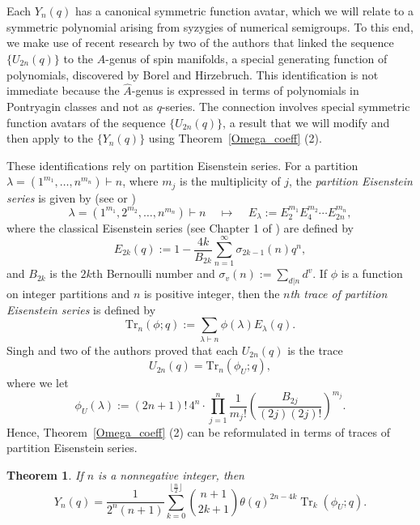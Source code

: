 \documentclass[11pt]{amsart}
\newtheorem{theorem}{Theorem}[section]
\theoremstyle{definition}
\theoremstyle{remark}
\numberwithin{equation}{section}
\DeclareMathOperator{\Tr}{Tr}
\begin{document}
Each $Y_n(q)$ has a canonical symmetric function avatar, which we will relate to a symmetric polynomial arising from syzygies of numerical semigroups. To this end, we make use of recent research by two of the authors that linked \cite[Th. 1.5]{AGO} the sequence $\{U_{2n}(q)\}$ to the $\widehat{A}$-genus of spin manifolds, a special generating function of polynomials, discovered by Borel and Hirzebruch. This identification is not immediate because the $\widehat{A}$-genus is expressed in terms of polynomials in Pontryagin classes \cite{Hitchin} and not as $q$-series. The connection involves special symmetric function avatars of the sequence $\{U_{2n}(q)\}$, a result that we will modify and then apply to the $\{Y_n(q)\}$ using Theorem~\ref{Omega_coeff} (2).


These identifications rely on partition Eisenstein series.
For a partition $\lambda=(1^{m_1},\dots,n^{m_n})\vdash n$, where $m_j$ is the multiplicity of $j$, the {\it partition Eisenstein series} is given by (see \cite[(1.5)]{AOS} or \cite[(1.2]{AGOS})
\begin{equation}\label{PartitionEisenstein}
\lambda=(1^{m_1}, 2^{m_2},\dots, n^{m_n}) \vdash n \ \ \ \ \ \longmapsto \ \ \ \ \  E_{\lambda}:= E_2^{m_1}E_4^{m_2}\cdots E_{2n}^{m_n},
\end{equation} 
where the classical Eisenstein series (see Chapter 1 of \cite{CBMS}) are defined by
\begin{equation}\label{Eisenstein}
E_{2k}(q):=1-\frac{4k}{B_{2k}}\sum_{n=1}^{\infty}\sigma_{2k-1}(n)q^n,
\end{equation}
and $B_{2k}$ is the $2k$th Bernoulli number and $\sigma_v(n):=\sum_{d\vert n}d^v$. 
If $\phi$ is a function on integer partitions and $n$ is positive integer, then the {\it $n$th trace of partition Eisenstein series} \cite[(1.6)]{AOS} is defined by
$$\text{Tr}_n(\phi;q):=\sum_{\lambda\vdash n} \phi(\lambda)E_{\lambda}(q).$$
Singh and two of the authors \cite[Th. 1.3 (1)]{AOS} proved that
each $U_{2n}(q)$ is the trace
\begin{equation}\label{U_Trace}
U_{2n}(q)=\text{Tr}_n(\phi_U;q),
\end{equation}
where we let
$$
\phi_U(\lambda):= (2n+1)!\, 4^n
\cdot \prod_{j=1}^n\frac1{m_j!}\left(\frac{ B_{2j}}{(2j)(2j)!}\right)^{m_j}.
$$
Hence, Theorem~\ref{Omega_coeff} (2) can be reformulated in terms of traces of partition Eisenstein series.
\begin{theorem}\label{Omega_coeff2}
If $n$ is a nonnegative integer, then
$$  {Y}_n(q) = \frac1{2^n(n+1)} \sum_{k=0}^{\lfloor\frac{n}2\rfloor} \binom{n+1}{2k+1} \theta(q)^{2n-4k} \Tr_k(\phi_U;q).$$
\end{theorem}
\end{document}
